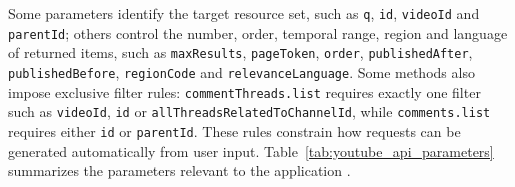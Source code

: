 Some parameters identify the target resource set, such as \texttt{q}, \texttt{id}, \texttt{videoId} and \texttt{parentId}; others control the number, order, temporal range, region and language of returned items, such as \texttt{maxResults}, \texttt{pageToken}, \texttt{order}, \texttt{publishedAfter}, \texttt{publishedBefore}, \texttt{regionCode} and \texttt{relevanceLanguage}. Some methods also impose exclusive filter rules: \texttt{commentThreads.\allowbreak list} requires exactly one filter such as \texttt{videoId}, \texttt{id} or \texttt{allThreadsRelatedTo\-ChannelId}, while \texttt{comments.\allowbreak list} requires either \texttt{id} or \texttt{parentId}. These rules constrain how requests can be generated automatically from user input. Table~\ref{tab:youtube_api_parameters} summarizes the parameters relevant to the application \autocite{youtube_data_api_docs}.

